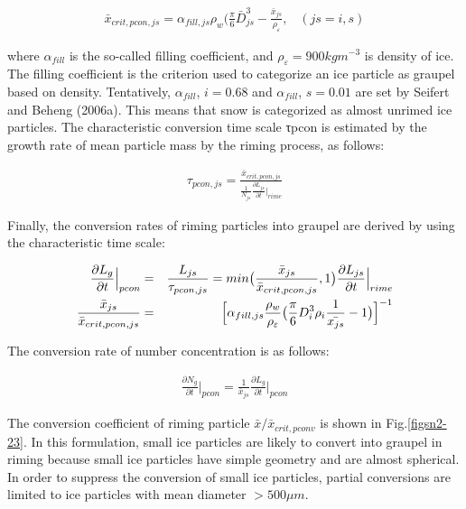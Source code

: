 \begin{eqnarray}
\bar{x}_{crit,pcon,js}=\alpha_{fill,js}\rho_{w}\bigl(\frac{\pi}{6}\bar{D}_{js}^{3}-\frac{\bar{x}_{js}}{\rho_{\varepsilon}},\;\;\;(js=i,s)\label{sn207}
\end{eqnarray}

where $\alpha_{fill}$ is the so-called filling coefficient, and $\rho_{\varepsilon} = 900 kg m^{-3}$ is density of ice. The filling coefficient is the criterion used to categorize an ice particle as graupel based on density. Tentatively, $\alpha_{fill}$, $i = 0.68$ and $\alpha_{fill}$, $s = 0.01$ are set by Seifert and Beheng (2006a). This means that snow is categorized as almost unrimed ice particles. The characteristic conversion time scale τpcon is estimated by the growth rate of mean particle mass by the riming process, as follows:

\begin{eqnarray}
\tau_{pcon,js}=\frac{\bar{x}_{crit,pcon,js}}{\frac{1}{N_{js}}\frac{\partial L_{js}}{\partial t}\Bigr|_{rime}}\label{sn208}
\end{eqnarray}

Finally, the conversion rates of riming particles into graupel are derived by using the characteristic time scale:

\begin{eqnarray}
\frac{\partial L_{g}}{\partial t}\Bigr|_{pcon}&=&\frac{L_{js}}{\tau_{pcon,js}}=min\bigl(\frac{\bar{x}_{js}}{\bar{x}_{crit,pcon,js}},1\bigr)\frac{\partial L_{js}}{\partial t}\Bigr|_{rime}\label{sn209}\\
\frac{\bar{x}_{js}}{\bar{x}_{crit,pcon,js}}&=&\Bigl[\alpha_{fill,js}\frac{\rho_{w}}{\rho_{\varepsilon}}\bigl(\frac{\pi}{6}D_{i}^{3}\rho_{i}\frac{1}{\bar{x_{js}}}-1\bigr)\Bigr]^{-1}\label{sn210}
\end{eqnarray}

The conversion rate of number concentration is as follows:

\begin{eqnarray}
\frac{\partial N_{g}}{\partial t}\Bigr|_{pcon}=\frac{1}{\bar{x}_{js}}\frac{\partial L_{g}}{\partial t}\Bigr|_{pcon}
\end{eqnarray}

The conversion coefficient of riming particle $\bar{x}/\bar{x}_{crit,pconv}$ is shown in Fig.\ref{figsn2-23}. In this formulation, small ice particles are likely to convert into graupel in riming because small ice particles have simple geometry and are almost spherical. In order to suppress the conversion of small ice particles, partial conversions are limited to ice particles with mean diameter $> 500 \mu m$.

